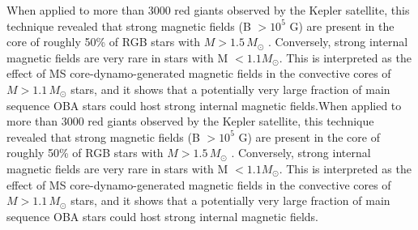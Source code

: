 When applied to more than 3000 red giants observed by the Kepler satellite, this technique revealed that strong magnetic fields (B $> 10^5$ G) are present in the core of roughly 50\% of RGB stars with $M \! > \! 1.5 \, M_\odot$ \citep{Stello_2016,Stello_2016a}. Conversely, strong internal magnetic fields are very rare in stars with M $< 1.1M_\odot$. This is interpreted as the effect of MS core-dynamo-generated magnetic fields in the convective cores of $M \! > \! 1.1 \, M_\odot$ stars, and it shows that a potentially very large fraction of main sequence OBA stars could host strong internal magnetic fields.When applied to more than 3000 red giants observed by the Kepler satellite, this technique revealed that strong magnetic fields (B $> 10^5$ G) are present in the core of roughly 50\% of RGB stars with $M \! > \! 1.5 \, M_\odot$ \citep{Stello_2016,Stello_2016a}. Conversely, strong internal magnetic fields are very rare in stars with M $< 1.1M_\odot$. This is interpreted as the effect of MS core-dynamo-generated magnetic fields in the convective cores of $M \! > \! 1.1 \, M_\odot$ stars, and it shows that a potentially very large fraction of main sequence OBA stars could host strong internal magnetic fields.



